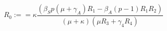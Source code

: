 \begin{equation*}
 R_0 := = \kappa\frac{(\beta_S p (\mu +\gamma_A)R_1- \beta_A (p-1)R_1R_2)}
 {(\mu+ \kappa)(\mu R_3 + \gamma_4 R_4)}
\end{equation*}